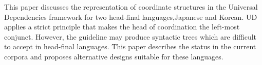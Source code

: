 This paper discusses the representation of coordinate structures in the Universal Dependencies framework for two head-final languages,Japanese and Korean. UD applies a strict principle that makes the head of coordination the left-most conjunct. However, the guideline may produce syntactic trees which are difficult to accept in head-final languages. This paper describes the status in the current corpora and proposes alternative designs suitable for these languages.
